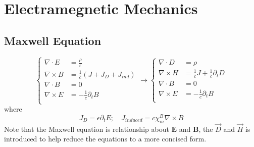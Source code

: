\chapter{Electramegnetic Mechanics}

\section{Maxwell Equation}
\begin{equation}
    \label{eqn:Maxwell}
    \left\{
    \begin{aligned}
	\nabla\cdot{E} &= \frac{\rho}{\epsilon}	\\
	\nabla\times{B} &= \frac{1}{c}\left( J + J_D + J_{ind}\right)	\\
	\nabla\cdot{B} &= 0  \\
	\nabla\times{E} &= -\frac{1}{c}\partial_{t}B	\\
    \end{aligned}
    \right.
    \longrightarrow
    \left\{
    \begin{aligned}
	\nabla\cdot{D} &= \rho	\\
	\nabla\times{H} &= \frac{1}{c}J +\frac{1}{c}\partial_{t}D    \\
	\nabla\cdot{B} &= 0  \\
	\nabla\times{E} &= -\frac{1}{c}\partial_{t}B	\\
    \end{aligned}
    \right.
\end{equation}
where 
\[
    J_D = \epsilon\partial_{t}E; \quad J_{induced} = c\chi_m^B\nabla\times{B}
    \]
Note that the Maxwell equation is relationship about $\mathbf{E}$ and
$\mathbf{B}$, the $\vec{D}$ and $\vec{H}$ is introduced to help reduce the
equations to a more concised form. 

